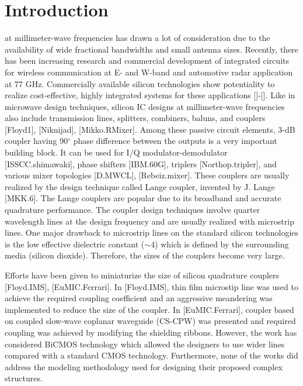 \documentclass[journal]{IEEEtran}
\begin{document}
\section{Introduction}
% 
% 
% 
% 
 at millimeter-wave frequencies has drawn a lot of consideration due to the availability of wide fractional bandwidths and small antenna sizes. Recently, there has been increasing research and commercial development of integrated circuits for wireless communication at E- and W-band and automotive radar application at 77 GHz. Commercially available silicon technologies show potentiality to realize cost-effective, highly integrated systems for these applications []-[]. Like in microwave design techniques, silicon IC designs at millimeter-wave frequencies also include transmission lines, splitters, combiners, baluns, and couplers [Floyd1], [Niknijad], [Mikko.RMixer]. Among these passive circuit elements, 3-dB coupler having 90$^\circ$ phase difference between the outputs is a very important building block. It can be used for I/Q modulator-demodulator [ISSCC.shimawaki], phase shifters [IBM.60G], triplers [Northop.tripler], and various mixer topologies [D.MWCL], [Rebeiz.mixer]. These couplers are usually realized by the design technique called Lange coupler, invented by J. Lange [MKK.6]. The Lange couplers are popular due to its broadband and accurate quadrature performance. The coupler design techniques involve quarter wavelength lines at the design frequency and are usually realized with microstrip lines. One major drawback to microstrip lines on the standard silicon technologies is the low effective dielectric constant ($\sim$4) which is defined by the surrounding media (silicon dioxide). Therefore, the sizes of the couplers become very large. 

Efforts have been given to miniaturize the size of silicon quadrature couplers [Floyd.IMS], [EuMIC.Ferrari]. In [Floyd.IMS], thin film microstip line was used to achieve the required coupling coefficient and an aggressive meandering was implemented to reduce the size of the coupler. In [EuMIC.Ferrari], coupler based on coupled slow-wave coplanar waveguide (CS-CPW) was presented and required coupling was achieved by modifying the shielding ribbons. However, the work has considered BiCMOS technology which allowed the designers to use wider lines compared with a standard CMOS technology. Furthermore, none of the works did address the modeling methodology used for designing their proposed complex structures. 
\end{document}

